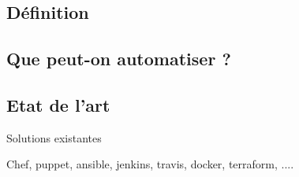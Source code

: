 
\subsection{Définition}

\subsection{Que peut-on automatiser ?}

\subsection{Etat de l'art}

Solutions existantes

Chef, puppet, ansible, jenkins, travis, docker, terraform, ....
